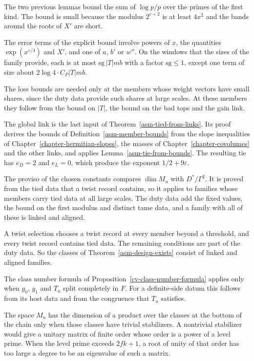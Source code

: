 The two previous lemmas bound the sum of $\log p/p$ over the primes of the
first kind. The bound is small because the modulus $2^{e+2}$ is at least
$4x^2$ and the bands around the roots of $X'$ are short.

The error terms of the explicit bound involve powers of $x$, the quantities
$\exp(x^{\varepsilon/4})$ and $X'$, and one of $a$, $b'$ or $w''$. On the
windows that the sizes of the family provide, each is at most
$\mathrm{sg}\,|T|mb$ with a factor $\mathrm{sg}\le1$, except one term of size
about $2\log4\cdot C_P|T|mb$.

The loss bounds are needed only at the members whose weight vectors have small
shares, since the duty data provide such shares at large scales. At these
members they follow from the bound on $|T|$, the bound on the bad tops and the
gain link.

The global link is the last input of Theorem~\ref{asm-tied-from-links}. Its
proof derives the bounds of Definition~\ref{asm-member-bounds} from the slope
inequalities of Chapter~\ref{chapter-hermitian-slopes}, the masses of
Chapter~\ref{chapter-covolumes} and the other links, and applies
Lemma~\ref{asm-tie-from-bounds}. The resulting tie has $e_D=2$ and $e_L=0$,
which produce the exponent $1/2+9\varepsilon$.

The proviso of the chosen constants compares $\dim M_u$ with $D^*/\Gamma^2$.
It is proved from the tied data that a twist record contains, so it applies to
families whose members carry tied data at all large scales. The duty data add
the fixed values, the bound on the first modulus and distinct tame data, and a
family with all of these is linked and aligned.

A twist selection chooses a twist record at every member beyond a threshold,
and every twist record contains tied data. The remaining conditions are part
of the duty data. So the classes of Theorem~\ref{asm-design-exists} consist of
linked and aligned families.

The class number formula of Proposition~\ref{cv-class-number-formula} applies
only when $g_0$, $g_1$ and $T_u$ split completely in $F$. For a definite-side
datum this follows from its host data and from the congruence that $T_u$
satisfies.

The space $M_u$ has the dimension of a product over the classes at the bottom
of the chain only when those classes have trivial stabilizers. A nontrivial
stabilizer would give a unitary matrix of finite order whose order is a power
of a level prime. When the level prime exceeds $2fk+1$, a root of unity of that
order has too large a degree to be an eigenvalue of such a matrix.

